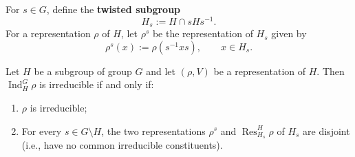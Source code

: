 \begin{defn}
For \(s \in G\), define the \textbf{twisted subgroup}
\[
H_s := H \cap s H s^{-1}.
\]
For a representation \(\rho\) of \(H\), let \(\rho^s\) be the representation of \(H_s\) given by
\[
\rho^s(x) := \rho(s^{-1} x s), \qquad x \in H_s.
\]
\end{defn}


\begin{thm}
Let \(H\) be a subgroup of group $G$ and let \((\rho, V)\) be a representation of \(H\). Then \(\operatorname{Ind}_H^G \rho\) is irreducible if and only if:

\begin{enumerate}
\item \(\rho\) is irreducible;
\item For every \(s \in G \setminus H\), the two representations \(\rho^s\) and \(\operatorname{Res}_{H_s}^H \rho\) of \(H_s\) are disjoint (i.e., have no common irreducible constituents).
\end{enumerate}
\end{thm}
